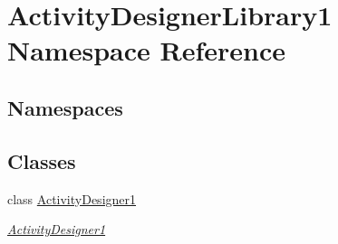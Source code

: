 \hypertarget{namespace_activity_designer_library1}{}\section{Activity\+Designer\+Library1 Namespace Reference}
\label{namespace_activity_designer_library1}
\subsection*{Namespaces}
\begin{DoxyCompactItemize}
\end{DoxyCompactItemize}
\subsection*{Classes}
\begin{DoxyCompactItemize}
\item 
class \hyperlink{class_activity_designer_library1_1_1_activity_designer1}{Activity\+Designer1}
\begin{DoxyCompactList}\small\item\em \hyperlink{class_activity_designer_library1_1_1_activity_designer1}{Activity\+Designer1} \end{DoxyCompactList}\end{DoxyCompactItemize}
